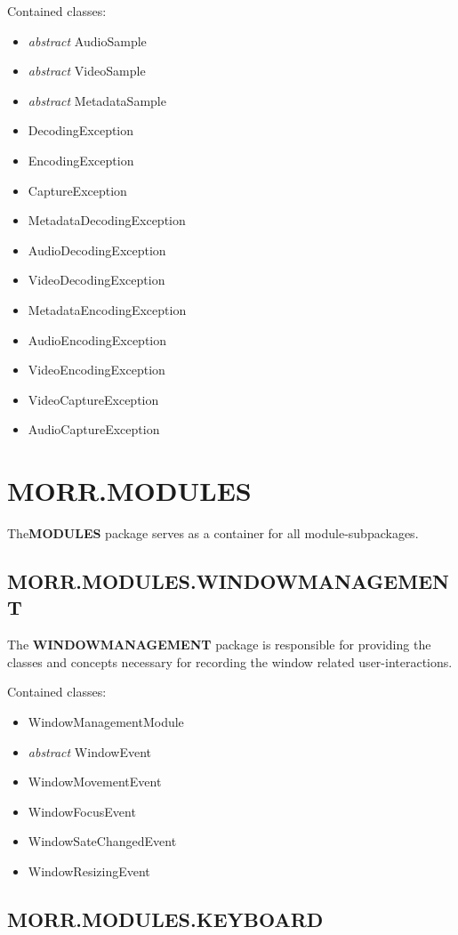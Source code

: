 Contained classes:
\begin{itemize}
\item \textit{abstract} AudioSample
\item \textit{abstract} VideoSample
\item \textit{abstract} MetadataSample
\item DecodingException
\item EncodingException
\item CaptureException
\item MetadataDecodingException
\item AudioDecodingException
\item VideoDecodingException
\item MetadataEncodingException
\item AudioEncodingException
\item VideoEncodingException
\item VideoCaptureException
\item AudioCaptureException
\end{itemize}

\newpage
\section{MORR.MODULES}

The\textbf{MODULES} package serves as a container for all module-subpackages.

\subsection*{MORR.MODULES.WINDOWMANAGEMENT}

The \textbf{WINDOWMANAGEMENT} package is responsible for providing the classes and concepts necessary for recording the window related user-interactions.

Contained classes:
\begin{itemize}
\item WindowManagementModule
\item \textit{abstract} WindowEvent
\item WindowMovementEvent
\item WindowFocusEvent
\item WindowSateChangedEvent
\item WindowResizingEvent
\end{itemize}
\newpage
\subsection*{MORR.MODULES.KEYBOARD}

